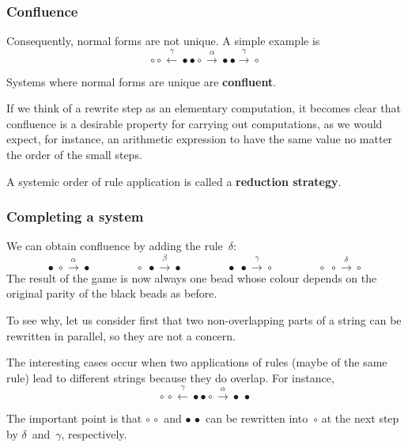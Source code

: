 \documentclass[compress,dvipdfmx]{beamer}
\begin{document}
\begin{frame}
  \frametitle{Confluence}

  Consequently, normal forms are not unique. A simple example is
  \begin{equation*}
    \circ \circ \xleftarrow{\gamma} \bullet \bullet \circ
    \xrightarrow{\alpha} \bullet \bullet \xrightarrow{\gamma}
    \circ
  \end{equation*}

  \medskip

  Systems where normal forms are unique are \textbf{confluent}.

  \bigskip

  If we think of a rewrite step as an elementary computation, it
  becomes clear that confluence is a desirable property for carrying
  out computations, as we would expect, for instance, an arithmetic
  expression to have the same value no matter the order of the small
  steps.

  \bigskip

  A systemic order of rule application is called a \textbf{reduction
    strategy}.

\end{frame}


\begin{frame}
  \frametitle{Completing a system}

  We can obtain confluence by adding the rule~\(\delta\):
  \begin{equation*}
    \bullet \; \circ   \xrightarrow{\alpha} \bullet\qquad\qquad
    \circ   \; \bullet \xrightarrow{\beta} \bullet\qquad\qquad
    \bullet \; \bullet \xrightarrow{\gamma}
    \circ\qquad\qquad
    \circ\; \circ \xrightarrow{\delta} \circ
  \end{equation*}
  The result of the game is now always one bead whose colour depends
  on the original parity of the black beads as before.

  \bigskip

  To see why, let us consider first that two non\hyp{}overlapping
  parts of a string can be rewritten in parallel, so they are not a
  concern.

  \bigskip

  The interesting cases occur when two applications of rules (maybe of
  the same rule) lead to different strings because they do
  overlap. For instance,
  \begin{equation*}
    \circ \, \circ \xleftarrow{\gamma} \bullet \bullet
    \circ \xrightarrow{\alpha} \bullet \, \bullet
  \end{equation*}

  \medskip

  The important point is that \(\circ \, \circ\) and \(\bullet \,
  \bullet\) can be rewritten into~\(\circ\) at the next step by
  \(\delta\)~and~\(\gamma\), respectively.

\end{frame}
\end{document}
